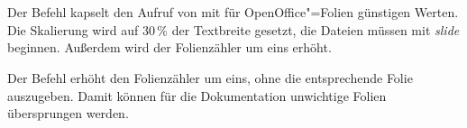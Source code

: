 \begin{nutzung}
		\>\\
	\beispiel
		\>\\
		\>
\end{nutzung}

\DescribeMacro{\nextslide}
Der Befehl  kapselt den Aufruf von  mit für OpenOffice"=Folien günstigen Werten.
Die Skalierung wird auf 30\,\% der Textbreite gesetzt, die Dateien müssen mit \emph{slide} beginnen.
Außerdem wird der Folienzähler um eins erhöht.

\begin{nutzung}
		\>
\end{nutzung}

\DescribeMacro{\nextslidesilent}
Der Befehl  erhöht den Folienzähler um eins, ohne die entsprechende Folie auszugeben.
Damit können \zB für die Dokumentation unwichtige Folien übersprungen werden.

\begin{nutzung}
		\>
\end{nutzung}


